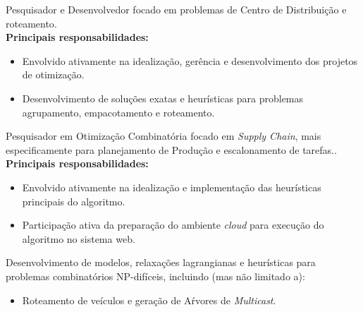 \documentclass[10pt,a4paper,ragged2e,withhyper]{altacv}
\begin{document}
\begin{paracol}{2}
            {Pesquisador e Desenvolvedor focado em problemas de Centro de Distribuição e roteamento}. \\
            \medskip
            \textbf{Principais responsabilidades:}
            \medskip
            \begin{itemize}
                \item Envolvido ativamente na idealização, gerência e desenvolvimento dos projetos de otimização.
                \item Desenvolvimento de soluções exatas e heurísticas para problemas agrupamento, empacotamento e roteamento. 
            \end{itemize}
        \divider
            {Pesquisador em Otimização Combinatória focado em \textit{Supply Chain}, mais especificamente para planejamento de Produção e escalonamento de tarefas.}.\\
            \medskip
            \textbf{Principais responsabilidades:}
            \medskip
            \begin{itemize}
                \item Envolvido ativamente na idealização e implementação das heurísticas principais do algoritmo.
                \item Participação ativa da preparação do ambiente \textit{cloud} para execução do algoritmo no sistema web.
            \end{itemize}
	    {Desenvolvimento de modelos, relaxações lagrangianas e heurísticas para problemas combinatórios NP-difíceis, incluindo (mas não limitado a):} \\
	      \begin{itemize}
		        \item Roteamento de veículos e geração de Aŕvores de \textit{Multicast}.
		  \end{itemize}
		\divider
        \begin{itemize}

\end{itemize}
\end{paracol}
\end{document}
